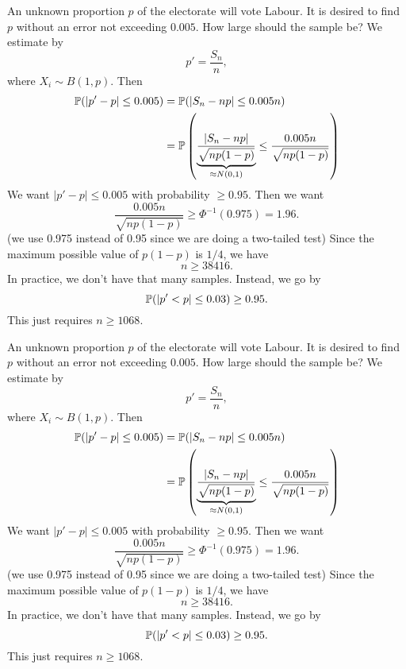 \begin{note}
  \begin{field}
    \begin{eg}
      An unknown proportion $p$ of the electorate will vote Labour. It is desired to find $p$ without an error not exceeding $0.005$. How large should the sample be?
      We estimate by
      \[
        p' = \frac{S_n}{n},
      \]
      where $X_i\sim B(1, p)$. Then
      \begin{align*}
        \P(|p' - p| \leq 0.005) &= \P(|S_n - np| \leq 0.005n)\\
        &= \P\left(\underbrace{\frac{|S_n - np|}{\sqrt{np(1 - p)}}}_{\approx N(0, 1)} \leq \frac{0.005n}{\sqrt{np(1 - p)}}\right)
      \end{align*}
      We want $|p' - p| \leq 0.005$ with probability $\geq 0.95$. Then we want
      \[
        \frac{0.005n}{\sqrt{np(1 - p)}} \geq \Phi^{-1}(0.975) = 1.96.
      \]
      (we use 0.975 instead of 0.95 since we are doing a two-tailed test) Since the maximum possible value of $p(1 - p)$ is $1/4$, we have
      \[
        n \geq 38416.
      \]
      In practice, we don't have that many samples. Instead, we go by
      \[
        \P(|p' < p| \leq 0.03) \geq 0.95.
      \]
      This just requires $n \geq 1068$.
    \end{eg}
  \end{field}
  \begin{field}
    \begin{eg}
      An unknown proportion $p$ of the electorate will vote Labour. It is desired to find $p$ without an error not exceeding $0.005$. How large should the sample be?
      We estimate by
      \[
        p' = \frac{S_n}{n},
      \]
      where $X_i\sim B(1, p)$. Then
      \begin{align*}
        \P(|p' - p| \leq 0.005) &= \P(|S_n - np| \leq 0.005n)\\
        &= \P\left(\underbrace{\frac{|S_n - np|}{\sqrt{np(1 - p)}}}_{\approx N(0, 1)} \leq \frac{0.005n}{\sqrt{np(1 - p)}}\right)
      \end{align*}
      We want $|p' - p| \leq 0.005$ with probability $\geq 0.95$. Then we want
      \[
        \frac{0.005n}{\sqrt{np(1 - p)}} \geq \Phi^{-1}(0.975) = 1.96.
      \]
      (we use 0.975 instead of 0.95 since we are doing a two-tailed test) Since the maximum possible value of $p(1 - p)$ is $1/4$, we have
      \[
        n \geq 38416.
      \]
      In practice, we don't have that many samples. Instead, we go by
      \[
        \P(|p' < p| \leq 0.03) \geq 0.95.
      \]
      This just requires $n \geq 1068$.
    \end{eg}
  \end{field}
  \xplain{}%
\end{note}

